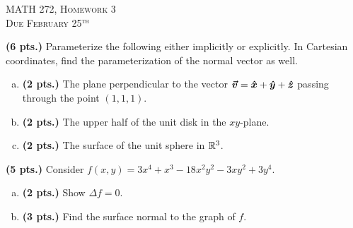 \documentclass[12pt]{article} %
\begin{document}
\begin{center}
   \textsc{\large MATH 272, Homework 3}\\
   \textsc{Due February 25$^\textrm{th}$}
\end{center}
\vspace{.5cm}

\begin{problem}
	\textbf{(6 pts.)} Parameterize the following either implicitly or explicitly. In Cartesian coordinates, find the parameterization of the normal vector as well.
	\begin{enumerate}[(a)]
		\item \textbf{(2 pts.)} The plane perpendicular to the vector $\boldsymbol{\vec{v}} = \boldsymbol{\hat{x}} + \boldsymbol{\hat{y}} + \boldsymbol{\hat{z}}$ passing through the point $(1,1,1)$.
		\item \textbf{(2 pts.)} The upper half of the unit disk in the $xy$-plane.
		\item \textbf{(2 pts.)} The surface of the unit sphere in $\mathbb{R}^3$.
	\end{enumerate}
\end{problem}

\vspace*{0.5cm}

\begin{problem}
\textbf{(5 pts.)} Consider $f(x,y)= 3x^4+x^3-18x^2y^2-3xy^2+3y^4$.
\begin{enumerate}[(a)]
    \item \textbf{(2 pts.)} Show $\Delta f = 0$.
    \item \textbf{(3 pts.)} Find the surface normal to the graph of $f$.
\end{enumerate}
\end{problem}

\vspace*{0.5cm}
\end{document}
